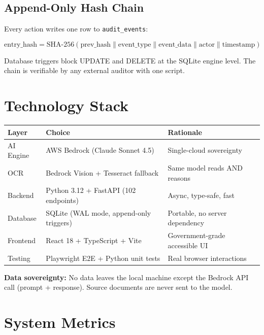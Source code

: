\documentclass[11pt,a4paper]{article}
\begin{document}
\subsection{Append-Only Hash Chain}

Every action writes one row to \texttt{audit\_events}:

$$\text{entry\_hash} = \text{SHA-256}(\text{prev\_hash} \| \text{event\_type} \| \text{event\_data} \| \text{actor} \| \text{timestamp})$$

Database triggers block UPDATE and DELETE at the SQLite engine level. The chain is verifiable by any external auditor with one script.

\section{Technology Stack}

\begin{center}
\begin{tabular}{lll}
\toprule
\textbf{Layer} & \textbf{Choice} & \textbf{Rationale} \\
\midrule
AI Engine & AWS Bedrock (Claude Sonnet 4.5) & Single-cloud sovereignty \\
OCR & Bedrock Vision + Tesseract fallback & Same model reads AND reasons \\
Backend & Python 3.12 + FastAPI (102 endpoints) & Async, type-safe, fast \\
Database & SQLite (WAL mode, append-only triggers) & Portable, no server dependency \\
Frontend & React 18 + TypeScript + Vite & Government-grade accessible UI \\
Testing & Playwright E2E + Python unit tests & Real browser interactions \\
\bottomrule
\end{tabular}
\end{center}

\textbf{Data sovereignty:} No data leaves the local machine except the Bedrock API call (prompt + response). Source documents are never sent to the model.

\section{System Metrics}
\end{document}
